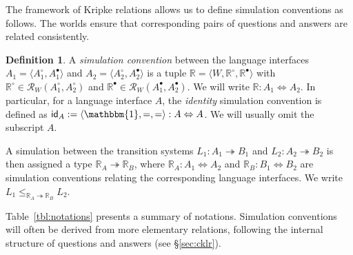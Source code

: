 \documentclass[11pt,oneside,draft]{book}
\theoremstyle{definition}
\newtheorem{definition}[theorem]{Definition}
\newcommand{\kw}[1]{\ensuremath{ \mathsf{#1} }}
\newcommand{\que}{\circ}         %
\newcommand{\ans}{\bullet}       %
\begin{document}
The framework of Kripke relations allows us
to define simulation conventions as follows.
The worlds ensure that corresponding pairs of
questions and answers are related consistently.

\begin{definition} \label{def:simconv} %
A \emph{simulation convention} between the language interfaces
$A_1 = \langle A_1^\que, A_1^\ans \rangle$ and
$A_2 = \langle A_2^\que, A_2^\ans \rangle$
is a tuple $\mathbb{R} = \langle W, \mathbb{R}^\que, \mathbb{R}^\ans \rangle$
with $\mathbb{R}^\que \in \mathcal{R}_W(A_1^\que, A_2^\que)$
and $\mathbb{R}^\ans \in \mathcal{R}_W(A_1^\ans, A_2^\ans)$.
We will write $\mathbb{R} : A_1 \Leftrightarrow A_2$.
In particular,
for a language interface $A$,
the \emph{identity} simulation convention
is defined as
$\kw{id}_A := \langle \mathbbm{1}, {=}, {=} \rangle
  : A \Leftrightarrow A$.
We will usually omit the subscript $A$.
\end{definition}

A simulation between the transition systems
$L_1 : A_1 \twoheadrightarrow B_1$ and
$L_2 : A_2 \twoheadrightarrow B_2$
is then assigned a type $\mathbb{R}_A \twoheadrightarrow \mathbb{R}_B$,
where %
$\mathbb{R}_A : A_1 \Leftrightarrow A_2$ and
$\mathbb{R}_B : B_1 \Leftrightarrow B_2$
are simulation conventions
relating the corresponding language interfaces.
We write
$L_1 \le_{\mathbb{R}_A \twoheadrightarrow \mathbb{R}_B} L_2$.

Table~\ref{tbl:notations} presents a summary of notations.
Simulation conventions
will often be derived from
more elementary relations,
following the internal structure of questions and answers
(see \S\ref{sec:cklr}).
\end{document}
